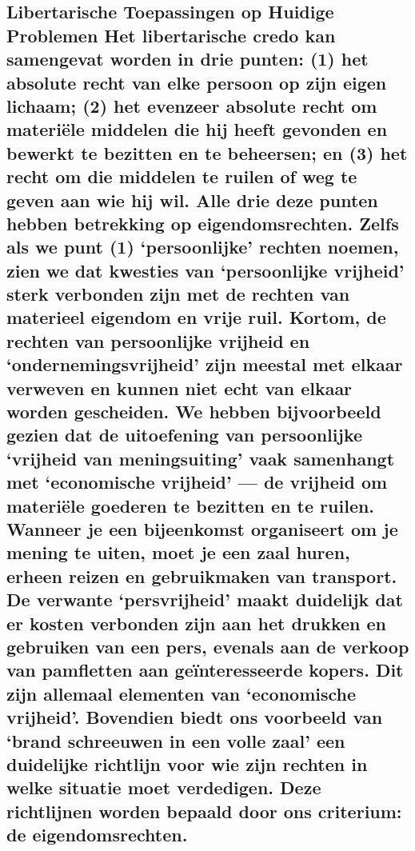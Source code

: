 \documentclass[
  a5paper,
  smalldemyvopaper,10pt,twoside,onecolumn,openright,extrafontsizes,hidelinks]{memoir}
\begin{document}
\subsection{Libertarische Toepassingen op Huidige Problemen Het
libertarische credo kan samengevat worden in drie punten: (1) het
absolute recht van elke persoon op zijn eigen lichaam; (2) het evenzeer
absolute recht om materiële middelen die hij heeft gevonden en bewerkt
te bezitten en te beheersen; en (3) het recht om die middelen te ruilen
of weg te geven aan wie hij wil. Alle drie deze punten hebben betrekking
op eigendomsrechten. Zelfs als we punt (1) `persoonlijke' rechten
noemen, zien we dat kwesties van `persoonlijke vrijheid' sterk verbonden
zijn met de rechten van materieel eigendom en vrije ruil. Kortom, de
rechten van persoonlijke vrijheid en `ondernemingsvrijheid' zijn meestal
met elkaar verweven en kunnen niet echt van elkaar worden gescheiden. We
hebben bijvoorbeeld gezien dat de uitoefening van persoonlijke `vrijheid
van meningsuiting' vaak samenhangt met `economische vrijheid' --- de
vrijheid om materiële goederen te bezitten en te ruilen. Wanneer je een
bijeenkomst organiseert om je mening te uiten, moet je een zaal huren,
erheen reizen en gebruikmaken van transport. De verwante `persvrijheid'
maakt duidelijk dat er kosten verbonden zijn aan het drukken en
gebruiken van een pers, evenals aan de verkoop van pamfletten aan
geïnteresseerde kopers. Dit zijn allemaal elementen van `economische
vrijheid'. Bovendien biedt ons voorbeeld van `brand schreeuwen in een
volle zaal' een duidelijke richtlijn voor wie zijn rechten in welke
situatie moet verdedigen. Deze richtlijnen worden bepaald door ons
criterium: de
eigendomsrechten.}\label{libertarische-toepassingen-op-huidige-problemen-het-libertarische-credo-kan-samengevat-worden-in-drie-punten-1-het-absolute-recht-van-elke-persoon-op-zijn-eigen-lichaam-2-het-evenzeer-absolute-recht-om-materiuxeble-middelen-die-hij-heeft-gevonden-en-bewerkt-te-bezitten-en-te-beheersen-en-3-het-recht-om-die-middelen-te-ruilen-of-weg-te-geven-aan-wie-hij-wil.-alle-drie-deze-punten-hebben-betrekking-op-eigendomsrechten.-zelfs-als-we-punt-1-persoonlijke-rechten-noemen-zien-we-dat-kwesties-van-persoonlijke-vrijheid-sterk-verbonden-zijn-met-de-rechten-van-materieel-eigendom-en-vrije-ruil.-kortom-de-rechten-van-persoonlijke-vrijheid-en-ondernemingsvrijheid-zijn-meestal-met-elkaar-verweven-en-kunnen-niet-echt-van-elkaar-worden-gescheiden.-we-hebben-bijvoorbeeld-gezien-dat-de-uitoefening-van-persoonlijke-vrijheid-van-meningsuiting-vaak-samenhangt-met-economische-vrijheid-de-vrijheid-om-materiuxeble-goederen-te-bezitten-en-te-ruilen.-wanneer-je-een-bijeenkomst-organiseert-om-je-mening-te-uiten-moet-je-een-zaal-huren-erheen-reizen-en-gebruikmaken-van-transport.-de-verwante-persvrijheid-maakt-duidelijk-dat-er-kosten-verbonden-zijn-aan-het-drukken-en-gebruiken-van-een-pers-evenals-aan-de-verkoop-van-pamfletten-aan-geuxefnteresseerde-kopers.-dit-zijn-allemaal-elementen-van-economische-vrijheid.-bovendien-biedt-ons-voorbeeld-van-brand-schreeuwen-in-een-volle-zaal-een-duidelijke-richtlijn-voor-wie-zijn-rechten-in-welke-situatie-moet-verdedigen.-deze-richtlijnen-worden-bepaald-door-ons-criterium-de-eigendomsrechten.}
\end{document}
